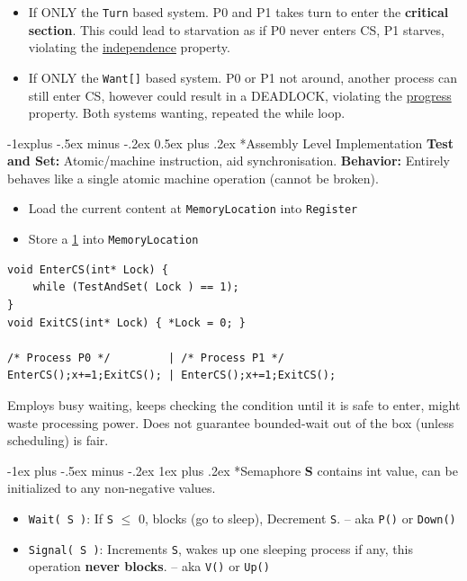 \documentclass[10pt,landscape]{article}
\makeatletter
\renewcommand{\subsection}{\@startsection{section}{1}{0mm}%
                                {-1ex plus -.5ex minus -.2ex}%
                                {0.5ex plus .2ex}%
                                {\normalfont\large\bfseries}}
\renewcommand{\subsection}{\@startsection{subsection}{2}{0mm}%
                                {-1explus -.5ex minus -.2ex}%
                                {0.5ex plus .2ex}%
                                {\normalfont\normalsize\bfseries}}
\renewcommand{\subsubsection}{\@startsection{subsubsection}{3}{0mm}%
                                {-1ex plus -.5ex minus -.2ex}%
                                {1ex plus .2ex}%
                                {\normalfont\small\bfseries}}
\makeatother
\begin{document}
\begin{multicols*}{3}
\begin{itemize}[topsep=0pt,noitemsep,wide=0pt, leftmargin=\dimexpr{} + 2\relax]
    \item If ONLY the \verb|Turn| based system. P0 and P1 takes turn to enter the \textbf{critical section}.
    This could lead to starvation as if P0 never enters CS, P1 starves, violating the \underline{independence} property.
    \item If ONLY the \verb|Want[]| based system. P0 or P1 not around, another process can still enter CS, however could result in a DEADLOCK, violating the \underline{progress} property.    
    Both systems wanting, repeated the while loop.
\end{itemize}

\subsection*{Assembly Level Implementation}
\textbf{Test and Set:} Atomic/machine instruction, aid synchronisation.
\textbf{Behavior:} Entirely behaves like a single atomic machine operation (cannot be broken).
\begin{itemize}[topsep=0pt,noitemsep,wide=0pt, leftmargin=\dimexpr{} + 2\relax]
    \item Load the current content at \verb|MemoryLocation| into \verb|Register|
    \item Store a \underline{1} into \verb|MemoryLocation|
\end{itemize}
\begin{lstlisting}
void EnterCS(int* Lock) { 
    while (TestAndSet( Lock ) == 1); 
}
void ExitCS(int* Lock) { *Lock = 0; }

/* Process P0 */         | /* Process P1 */
EnterCS();x+=1;ExitCS(); | EnterCS();x+=1;ExitCS();
\end{lstlisting}

Employs busy waiting, keeps checking the condition until it is safe to enter, might waste processing power.
Does not guarantee bounded-wait out of the box (unless scheduling) is fair.

\subsubsection*{Semaphore}
\textbf{S} contains int value, can be initialized to any non-negative values.
\begin{itemize}[topsep=0pt,noitemsep,wide=0pt, leftmargin=\dimexpr{} + 2\relax]
    \item \verb|Wait( S )|: If \verb|S| $\leq$ 0, blocks (go to sleep), Decrement \verb|S|. -- aka \verb|P()| or \verb|Down()|
    \item \verb|Signal( S )|: Increments \verb|S|, wakes up one sleeping process if any, this operation \textbf{never blocks}. -- aka \verb|V()| or \verb|Up()|
\end{itemize}


\end{multicols*}
\end{document}
